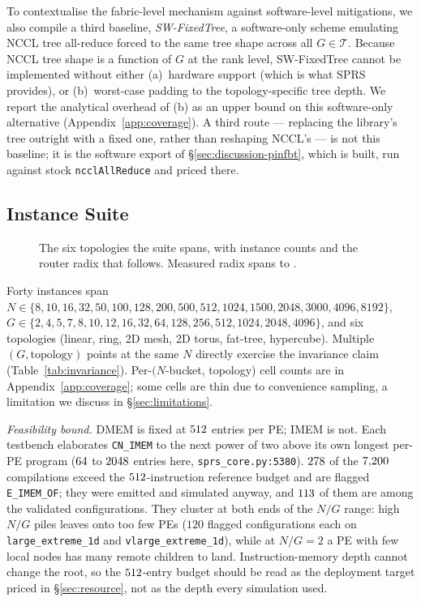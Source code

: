 \documentclass[journal,10pt]{IEEEtran}
\theoremstyle{plain}
\theoremstyle{definition}
\theoremstyle{remark}
\newcommand{\sprs}{\textsc{SPRS}}
\newcommand{\sv}[1]{\texttt{#1}}
\newcommand{\T}{\ensuremath{\mathcal{T}}}
\begin{document}
To contextualise the fabric-level mechanism against software-level
mitigations, we also compile a third baseline, \emph{SW-FixedTree}, a
software-only scheme emulating NCCL tree all-reduce forced to the same
tree shape across all $G \in \T$. Because NCCL tree shape is a function
of $G$ at the rank level, SW-FixedTree cannot be implemented without
either (a)~hardware support (which is what \sprs{} provides), or
(b)~worst-case padding to the topology-specific tree depth. We report
the analytical overhead of (b) as an upper bound on this software-only
alternative (Appendix~\ref{app:coverage}). A third route --- replacing the
library's tree outright with a fixed one, rather than reshaping NCCL's --- is
not this baseline; it is the software export of
\S\ref{sec:discussion-pinfbt}, which is built, run against stock
\texttt{ncclAllReduce} and priced there.

\subsection{Instance Suite}\label{sec:method-suite}

\begin{figure}[!t]\centering

\caption{The six topologies the suite spans, with instance counts and the router radix that follows. Measured radix spans \RadixMin{} to \RadixMax{}.}\label{fig:topologies}
\end{figure}


Forty instances span $N \in \{8, 10, 16, 32, 50, 100, 128, 200, 500,
512, 1024, 1500, 2048, 3000, 4096, 8192\}$, $G \in \{2, 4, 5, 7, 8, 10,
12, 16, 32, 64, 128, 256, 512, 1024, 2048, 4096\}$, and six topologies
(linear, ring, 2D mesh, 2D torus, fat-tree, hypercube). Multiple
$(G, \text{topology})$ points at the same $N$ directly exercise the
invariance claim (Table~\ref{tab:invariance}). Per-$(N$-bucket,
topology) cell counts are in Appendix~\ref{app:coverage}; some cells
are thin due to convenience sampling, a limitation we discuss in
\S\ref{sec:limitations}.

\emph{Feasibility bound.} DMEM is fixed at $512$ entries per PE; IMEM is
not. Each testbench elaborates \sv{CN\_IMEM} to the next power of two above
its own longest per-PE program ($64$ to $2048$ entries
here, \sv{sprs\_core.py:5380}). $278$ of the $7{,}200$
compilations exceed the
$512$-instruction reference budget and are flagged \sv{E\_IMEM\_OF}; they were
emitted and simulated anyway, and $113$ of them are among the \WallTBs{}
validated configurations. They cluster at both ends of the $N/G$ range: high
$N/G$ piles leaves onto too few PEs ($120$ flagged configurations each on
\sv{large\_extreme\_1d} and \sv{vlarge\_extreme\_1d}), while at $N/G = 2$ a PE
with few local nodes has many remote children to land. Instruction-memory
depth cannot change the root, so the $512$-entry budget should be read as the
deployment target priced in \S\ref{sec:resource}, not as the depth every
simulation used.
\end{document}
